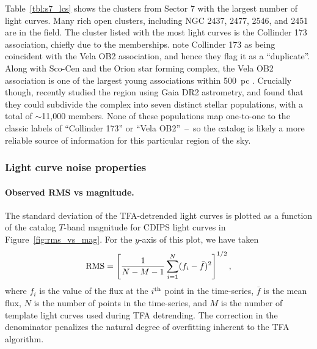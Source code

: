 \documentclass[12pt,twocolumn,tighten]{aastex62}
\begin{document}
Table~\ref{tbl:s7_lcs} shows the clusters from Sector 7 with the
largest number of light curves.  Many rich open clusters, including
NGC 2437, 2477, 2546, and 2451 are in the field.  The cluster listed
with the most light curves is the Collinder 173 association, chiefly
due to the \citet{dias_proper_2014} memberships.
\citet{Kharchenko_et_al_2013} note Collinder 173 as being coincident
with the Vela OB2 association, and hence they flag it as a
``duplicate''.  Along with Sco-Cen and the Orion star forming complex,
the Vela OB2 association is one of the largest young associations
within 500~pc \citep{zari_3d_2018}.  Crucially though,
\citet{cantat-gaudin_velaOB2_2019} recently studied the region using
Gaia DR2 astrometry, and found that they could subdivide the complex
into seven distinct stellar populations, with a total of $\sim$11,000
members.  None of these populations map one-to-one to the classic
labels of ``Collinder 173'' or ``Vela OB2''~--~so the
\citet{cantat-gaudin_velaOB2_2019} catalog is likely a more reliable
source of information for this particular region of the sky.


\subsubsection{Light curve noise properties}
\label{subsubsec:rmsvsmag}

\paragraph{Observed RMS vs magnitude.}
The standard deviation of the TFA-detrended light curves is plotted as
a function of the catalog $T$-band magnitude for CDIPS light curves in
Figure~\ref{fig:rms_vs_mag}.
For the $y$-axis of this plot, we have taken
\begin{equation}
  {\rm RMS} = \left[
    \frac{1}{N-M-1}
    \sum_{i=1}^{N} (f_i - \bar{f})^2
  \right]^{1/2},
\end{equation}
where $f_i$ is the value of the flux at the $i^{\rm th}$ point in the
time-series, $\bar{f}$ is the mean flux, $N$ is the
number of points in the time-series, and $M$ is the number
of template light curves used during TFA detrending.
The correction in the denominator penalizes the natural degree of
overfitting inherent to the TFA algorithm.
\end{document}
